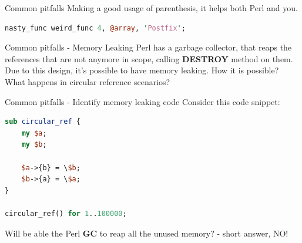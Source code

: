\documentclass[10pt]{beamer}
\begin{document}
\begin{frame}[fragile]{Common pitfalls}
Making a good usage of parenthesis, it helps both Perl and you.
\begin{lstlisting}[language=perl]
nasty_func weird_func 4, @array, 'Postfix';
\end{lstlisting}


\end{frame}





\begin{frame}[fragile]{Common pitfalls - Memory Leaking}
Perl has a garbage collector, that reaps the references that are not anymore in scope,  calling \textbf{DESTROY} method on them.
Due to this design, it's possible to have memory leaking.
How it is possible?
What happens in circular reference scenarios?

\end{frame}

\begin{frame}[fragile]{Common pitfalls - Identify memory leaking code}
Consider this code snippet:
\begin{lstlisting}[language=perl]
sub circular_ref {
	my $a;
	my $b;

	$a->{b} = \$b;
	$b->{a} = \$a;
}

circular_ref() for 1..100000;
\end{lstlisting}

Will be able the Perl \textbf{GC} to reap all the unused memory? - short answer, NO!
\pause
{}
\end{frame}
\end{document}
